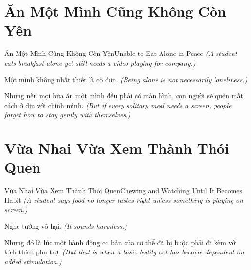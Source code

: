 \section{Ăn Một Mình Cũng Không Còn Yên}
\begin{truyen}{Ăn Một Mình Cũng Không Còn Yên}{Unable to Eat Alone in Peace}
\textit{(A student eats breakfast alone yet still needs a video playing for company.)}

Một mình không nhất thiết là cô đơn.
\textit{(Being alone is not necessarily loneliness.)}

Nhưng nếu mọi bữa ăn một mình đều phải có màn hình, con người sẽ quên mất cách ở dịu với chính mình.
\textit{(But if every solitary meal needs a screen, people forget how to stay gently with themselves.)}

\end{truyen}

\section{Vừa Nhai Vừa Xem Thành Thói Quen}
\begin{truyen}{Vừa Nhai Vừa Xem Thành Thói Quen}{Chewing and Watching Until It Becomes Habit}
\textit{(A student says food no longer tastes right unless something is playing on screen.)}

Nghe tưởng vô hại.
\textit{(It sounds harmless.)}

Nhưng đó là lúc một hành động cơ bản của cơ thể đã bị buộc phải đi kèm với kích thích phụ trợ.
\textit{(But that is when a basic bodily act has become dependent on added stimulation.)}

\end{truyen}

